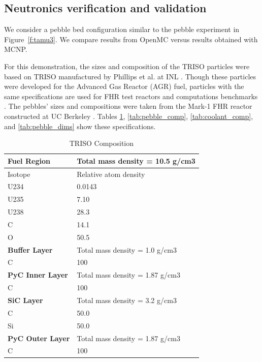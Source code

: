 \subsection{Neutronics verification and validation}

We consider a pebble bed configuration similar to the pebble experiment in Figure~\ref{f:tamu3}.
We compare results from OpenMC versus results obtained with MCNP.

For this demonstration, the sizes and composition of the TRISO particles were based on TRISO
manufactured by Phillips et al. at INL \cite{phillips2010}.  Though these particles were developed
for the Advanced Gas Reactor (AGR) fuel, particles with the same specifications are used for FHR
test reactors and computations benchmarks \cite{charalampos2014}.  The pebbles' sizes and compositions were taken from the Mark-1 FHR reactor constructed at UC Berkeley
\cite{charalampos2014}.  Tables \ref{tab:triso_comp}, \ref{tab:pebble_comp},
\ref{tab:coolant_comp}, and \ref{tab:pebble_dims} show these specifications.

\begin{table}
  \centering
  \begin{tabular}{|ll|}
    \hline \hline
    \textbf{Fuel Region}	 & Total mass density = 10.5 g/cm3 \\
    \hline
    Isotope	     & Relative atom density \\
    U234	       & 0.0143 \\
    U235	       & 7.10 \\
    U238	       & 28.3 \\
    C	           & 14.1 \\
    O	           & 50.5 \\
    \hline \hline
    \textbf{Buffer Layer} & Total mass density = 1.0 g/cm3 \\
    \hline
    C	           & 100 \\
    \hline \hline
    \textbf{PyC Inner Layer}	   & Total mass density = 1.87 g/cm3 \\
    \hline
    C	           & 100 \\
    \hline \hline
    \textbf{SiC Layer}	   & Total mass density = 3.2 g/cm3 \\
    \hline
    C	           & 50.0 \\
    Si	         & 50.0 \\
    \hline \hline
    \textbf{PyC Outer Layer}	     & Total mass density = 1.87 g/cm3 \\
    \hline
    C	           & 100 \\
    \hline \hline
  \end{tabular}
  \caption{TRISO Composition}
  \label{tab:triso_comp}
\end{table}


